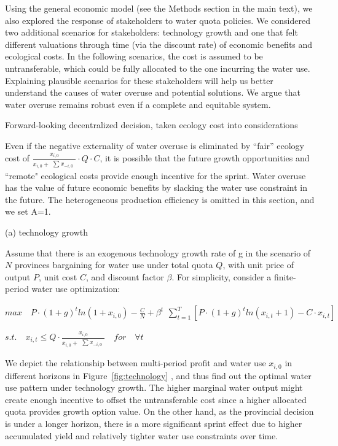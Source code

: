 Using the general economic model (see the Methods section in the main text), we also explored the response of stakeholders to water quota policies. We considered two additional scenarios for stakeholders: technology growth and one that felt different valuations through time (via the discount rate) of economic benefits and ecological costs. In the following scenarios, the cost is assumed to be untransferable, which could be fully allocated to the one incurring the water use. Explaining plausible scenarios for these stakeholders will help us better understand the causes of water overuse and potential solutions. We argue that water overuse remains robust even if a complete and equitable system.

    \begin{case_appendix}Forward-looking decentralized decision, taken ecology cost into considerations

    Even if the negative externality of water overuse is eliminated by ``fair'' ecology cost of $\frac{x_{i,0}}{x_{i,0} + \begin{matrix} \sum x_{-i,0} \end{matrix}} \cdot Q \cdot C$, it is possible that the future growth opportunities and ``remote" ecological costs provide enough incentive for the sprint.  Water overuse has the value of future economic benefits by slacking the water use constraint in the future. The heterogeneous production efficiency is omitted in this section, and we set A=1.

(a) technology growth

Assume that there is an exogenous technology growth rate of g in the scenario of $N$ provinces bargaining for water use under total quota $Q$, with unit price of output $P$, unit cost $C$, and discount factor $\beta$. For simplicity, consider a finite-period water use optimization:

$ max \quad P \cdot (1+g)^t ln(1+x_{i,0})-\frac{C}{N}+\beta^t \begin{matrix} \sum_{t=1}^T [P \cdot (1+g)^t ln(x_{i,t}+1)-C \cdot x_{i,t}] \end{matrix}$

$s.t. \quad x_{i,t} \leq Q \cdot \frac{x_{i,0}}{x_{i,0} + \begin{matrix} \sum x_{-i,0} \end{matrix}} \quad for \quad \forall t$

We depict the relationship between multi-period profit and water use $x_{i,0}$ in different horizons in Figure~\ref{fig:technology}
, and thus find out the optimal water use pattern under technology growth. The higher marginal water output might create enough incentive to offset the untransferable cost since a higher allocated quota provides growth option value. On the other hand, as the provincial decision is under a longer horizon, there is a more significant sprint effect due to higher accumulated yield and relatively tighter water use constraints over time.


\end{case_appendix}
